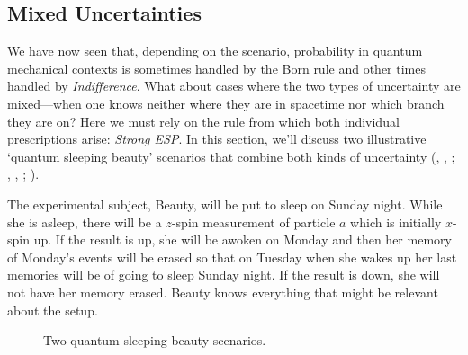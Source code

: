 \documentclass[12pt,onecolumn,secnumarabic,amsmath,amssymb,balancelastpage,nofootinbib]{article}
\begin{document}
\subsection{Mixed Uncertainties}\label{mixed}

We have now seen that, depending on the scenario, probability in quantum mechanical contexts is sometimes handled by the Born rule and other times handled by \emph{Indifference}.  What about cases where the two types of uncertainty are mixed---when one knows neither where they are in spacetime nor which branch they are on?  Here we must rely on the rule from which both individual prescriptions arise: \emph{Strong ESP}.  In this section, we'll discuss two illustrative `quantum sleeping beauty' scenarios that combine both kinds of uncertainty (\citeauthor{plewis}, \citeyear{plewis}, \citeyear{lewis2009reply}; \citeauthor{papineau2009}, \citeyear{papineau2009}, \citeyear{papineau2009reply}; \citealp{peterson,bradley2011,bradley2014,wilson2013,groisman2013}).

\begin{description}[font=\normalfont\scshape]
\item[Two-Branch-Beauty] The experimental subject, Beauty, will be put to sleep on Sunday night.  While she is asleep, there will be a $z$-spin measurement of particle $a$ which is initially $x$-spin up.  If the result is up, she will be awoken on Monday and then her memory of Monday's events will be erased so that on Tuesday when she wakes up her last memories will be of going to sleep Sunday night.  If the result is down, she will not have her memory erased.  Beauty knows everything that might be relevant about the setup.
\end{description}

\begin{figure}[htb]
\caption{Two quantum sleeping beauty scenarios.}
\label{}
\end{figure}
\end{document}
